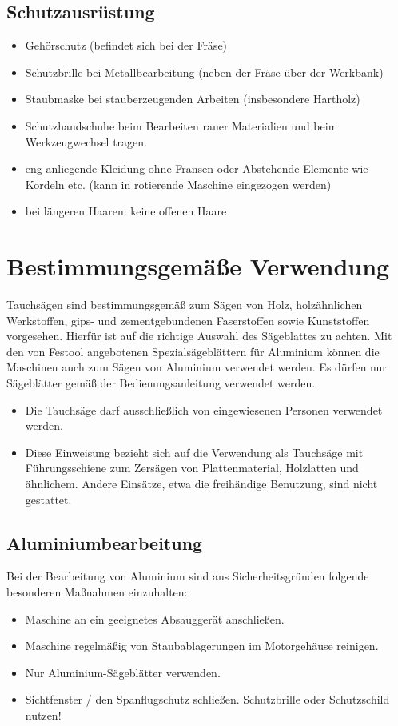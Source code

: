\documentclass{\basedir/fablab-document}
\begin{document}
\subsection{Schutzausrüstung}

\begin{itemize}
\item Gehörschutz (befindet sich bei der Fräse)
\item Schutzbrille bei Metallbearbeitung (neben der Fräse über der Werkbank)
\item Staubmaske bei stauberzeugenden Arbeiten (insbesondere Hartholz)
\item Schutzhandschuhe beim Bearbeiten rauer Materialien und beim Werkzeugwechsel tragen.
\item eng anliegende Kleidung ohne Fransen oder Abstehende Elemente wie Kordeln etc. (kann in rotierende Maschine eingezogen werden)
\item bei längeren Haaren: keine offenen Haare
\end{itemize}

\section{Bestimmungsgemäße Verwendung}
Tauchsägen sind bestimmungsgemäß zum Sägen von Holz, holzähnlichen Werkstoffen, gips- und zementgebundenen Faserstoffen sowie Kunststoffen vorgesehen. Hierfür ist auf die richtige Auswahl des Sägeblattes zu achten. Mit den von Festool angebotenen Spezialsägeblättern für Aluminium können die Maschinen auch zum Sägen von Aluminium verwendet werden. Es dürfen nur Sägeblätter gemäß der Bedienungsanleitung verwendet werden.
\begin{itemize}
\item Die Tauchsäge darf ausschließlich von eingewiesenen Personen verwendet werden.
\item Diese Einweisung bezieht sich auf die Verwendung als Tauchsäge mit Führungsschiene zum Zersägen von Plattenmaterial, Holzlatten und ähnlichem. Andere Einsätze, etwa die freihändige Benutzung, sind nicht gestattet.
\end{itemize}

\subsection{Aluminiumbearbeitung}
Bei der Bearbeitung von Aluminium sind aus Sicherheitsgründen folgende besonderen Maßnahmen einzuhalten:
\begin{itemize}
\item Maschine an ein geeignetes Absauggerät anschließen.
\item Maschine regelmäßig von Staubablagerungen im Motorgehäuse reinigen.
\item Nur Aluminium-Sägeblätter verwenden.
\item Sichtfenster / den Spanflugschutz schließen. Schutzbrille oder Schutzschild nutzen!
\end{itemize}
\end{document}
